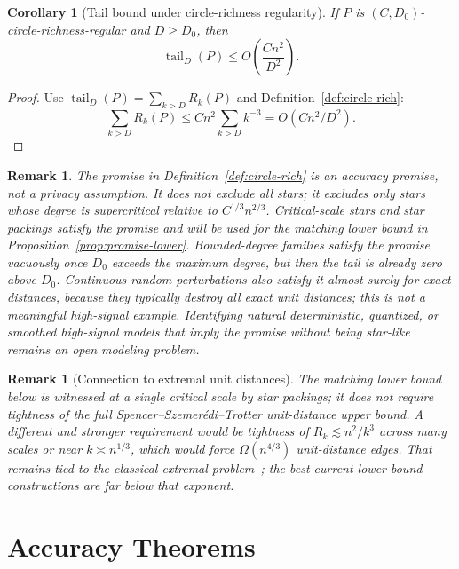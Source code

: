\documentclass[11pt]{article}
\newtheorem{corollary}[theorem]{Corollary}
\newtheorem{remark}[theorem]{Remark}
\newcommand{\tail}{\operatorname{tail}}
\begin{document}
\begin{corollary}[Tail bound under circle-richness regularity]
\label{cor:promise-tail}
If \(P\) is \((C,D_0)\)-circle-richness-regular and \(D\ge D_0\), then
\[
\tail_D(P)\le O\!\left(\frac{C n^2}{D^2}\right).
\]
\end{corollary}

\begin{proof}
Use \(\tail_D(P)=\sum_{k>D}R_k(P)\) and Definition~\ref{def:circle-rich}:
\[
\sum_{k>D}R_k(P)\le Cn^2\sum_{k>D}k^{-3}=O(Cn^2/D^2).
\]
\end{proof}

\begin{remark}
The promise in Definition~\ref{def:circle-rich} is an accuracy promise, not a privacy assumption. It does not exclude all stars; it excludes only stars whose degree is supercritical relative to \(C^{1/3}n^{2/3}\). Critical-scale stars and star packings satisfy the promise and will be used for the matching lower bound in Proposition~\ref{prop:promise-lower}. Bounded-degree families satisfy the promise vacuously once \(D_0\) exceeds the maximum degree, but then the tail is already zero above \(D_0\). Continuous random perturbations also satisfy it almost surely for exact distances, because they typically destroy all exact unit distances; this is not a meaningful high-signal example. Identifying natural deterministic, quantized, or smoothed high-signal models that imply the promise without being star-like remains an open modeling problem.
\end{remark}

\begin{remark}[Connection to extremal unit distances]
\label{rem:sst-tight}
The matching lower bound below is witnessed at a single critical scale by star packings; it does not require tightness of the full Spencer--Szemerédi--Trotter unit-distance upper bound. A different and stronger requirement would be tightness of \(R_k\lesssim n^2/k^3\) across many scales or near \(k\asymp n^{1/3}\), which would force \(\Omega(n^{4/3})\) unit-distance edges. That remains tied to the classical extremal problem~\cite{SpencerSzemerediTrotter84}; the best current lower-bound constructions are far below that exponent.
\end{remark}

\section{Accuracy Theorems}
\end{document}
